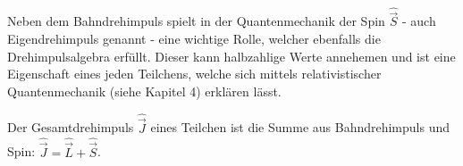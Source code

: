 Neben dem Bahndrehimpuls spielt in der Quantenmechanik der Spin $\hat{\vec{S}}$ - auch Eigendrehimpuls genannt - eine wichtige Rolle, welcher ebenfalls die Drehimpulsalgebra erfüllt. Dieser kann halbzahlige Werte annehemen und ist eine Eigenschaft eines jeden Teilchens, welche sich mittels relativistischer Quantenmechanik (siehe Kapitel 4) erklären lässt. 

Der Gesamtdrehimpuls $\hat{\vec{J}}$ eines Teilchen ist die Summe aus Bahndrehimpuls und Spin: $\hat{\vec{J}} = \hat{\vec{L}} + \hat{\vec{S}}$. 


%